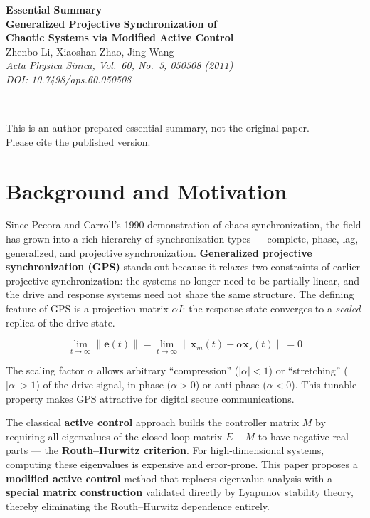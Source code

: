 \documentclass[11pt,a4paper]{article}
\begin{document}
\raggedbottom

\begin{center}
{\LARGE\bfseries\color{primary}Essential Summary}\\[12pt]
{\large\bfseries Generalized Projective Synchronization of\\Chaotic Systems via Modified Active Control}\\[8pt]
{\normalsize Zhenbo Li, Xiaoshan Zhao, Jing Wang}\\[4pt]
{\small\itshape Acta Physica Sinica, Vol.\ 60, No.\ 5, 050508 (2011)\\DOI: 10.7498/aps.60.050508}\\[6pt]
{\small\rule{0.7\textwidth}{0.5pt}}\\[4pt]
{\small\color{accent}This is an author-prepared essential summary, not the original paper.\\Please cite the published version.}
\end{center}

\vspace{0.5em}

\section{Background and Motivation}

Since Pecora and Carroll's 1990 demonstration of chaos synchronization, the field has grown into a rich hierarchy of synchronization types --- complete, phase, lag, generalized, and projective synchronization. \textbf{Generalized projective synchronization (GPS)} stands out because it relaxes two constraints of earlier projective synchronization: the systems no longer need to be partially linear, and the drive and response systems need not share the same structure. The defining feature of GPS is a projection matrix $\alpha I$: the response state converges to a \emph{scaled} replica of the drive state.

\begin{equation}
\lim_{t\to\infty}\lVert \mathbf{e}(t)\rVert = \lim_{t\to\infty}\lVert \mathbf{x}_m(t) - \alpha\mathbf{x}_s(t)\rVert = 0
\label{eq:gps}
\end{equation}

The scaling factor $\alpha$ allows arbitrary ``compression'' ($|\alpha|<1$) or ``stretching'' ($|\alpha|>1$) of the drive signal, in-phase ($\alpha>0$) or anti-phase ($\alpha<0$). This tunable property makes GPS attractive for digital secure communications.

The classical \textbf{active control} approach builds the controller matrix $M$ by requiring all eigenvalues of the closed-loop matrix $E-M$ to have negative real parts --- the \textbf{Routh--Hurwitz criterion}. For high-dimensional systems, computing these eigenvalues is expensive and error-prone. This paper proposes a \textbf{modified active control} method that replaces eigenvalue analysis with a \textbf{special matrix construction} validated directly by Lyapunov stability theory, thereby eliminating the Routh--Hurwitz dependence entirely.
\end{document}
